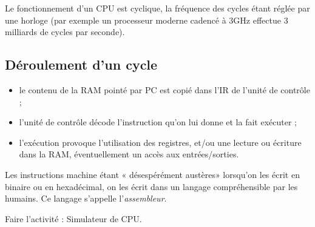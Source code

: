 Le fonctionnement d'un CPU est cyclique, la fréquence des cycles étant réglée par une horloge (par exemple un processeur moderne cadencé à 3GHz effectue 3 milliards de cycles par seconde).

\subsection*{Déroulement d'un cycle}

\begin{itemize}
    \item 	le contenu de la RAM pointé par PC est copié dans l'IR de l'unité de contrôle ;
    \item 	l'unité de contrôle décode l'instruction qu'on lui donne et la fait exécuter ;
    \item 	l'exécution provoque l'utilisation des registres, et/ou une lecture ou écriture dans la RAM, éventuellement un accès aux entrées/sorties.
\end{itemize}

Les instructions machine étant « désespérément austères»  lorsqu'on les écrit en binaire ou en hexadécimal, on les écrit dans un langage compréhensible par les humains. Ce langage s'appelle l'\textit{assembleur}.

\begin{exercice}[]
    Faire l'activité : Simulateur de CPU.
\end{exercice}